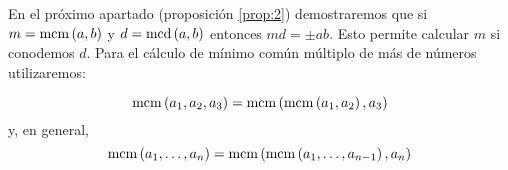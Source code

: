 En el próximo apartado (proposición \ref{prop:2}) demostraremos que si $m=\mcm{a,b}$ y $d=\mcd{a,b}$ entonces $md=\pm ab$. Esto permite calcular $m$ si conodemos $d$. Para el cálculo de mínimo común múltiplo de más de números utilizaremos:

\begin{ejer}   
    $$\mcm{a_1,a_2,a_3}=\mcm{\mcm{a_1,a_2},a_3}$$
    y, en general,
    $$\mcm{a_1,\dots,a_n}=\mcm{\mcm{a_1,\dots,a_{n-1}},a_n}$$        
\end{ejer}

\begin{prop}\label{prop:2}
    
\end{prop}